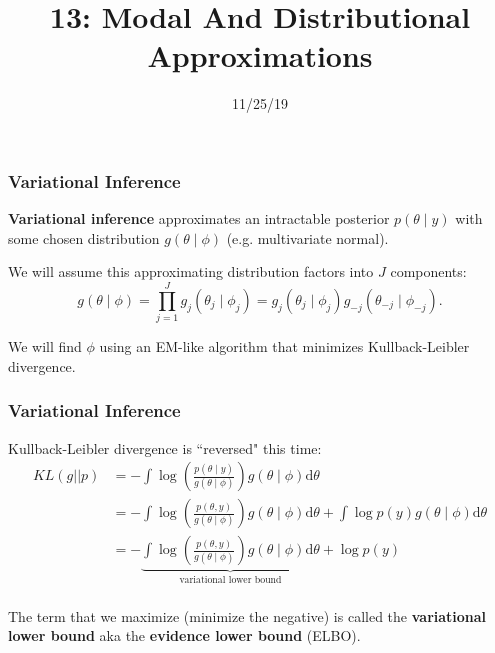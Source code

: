 \documentclass{beamer}
\title["13"]{13: Modal And Distributional Approximations}
\date{11/25/19}
\begin{document}

\begin{frame}
\titlepage 
\end{frame}


\begin{frame}[fragile]
\frametitle{Variational Inference}

{\bf Variational inference} approximates an intractable posterior $p(\theta \mid y)$ with some chosen distribution $g(\theta \mid \phi)$ (e.g. multivariate normal).
\newline
\pause

We will assume this approximating distribution factors into $J$ components:
$$
g(\theta \mid \phi) = \prod_{j=1}^J g_j(\theta_j \mid \phi_j) = g_j(\theta_j \mid \phi_j)g_{-j}(\theta_{-j} \mid \phi_{-j}).
$$


We will find $\phi$ using an EM-like algorithm that minimizes Kullback-Leibler divergence.

\end{frame}

\begin{frame}[fragile]
\frametitle{Variational Inference}

Kullback-Leibler divergence is ``reversed" this time:
\begin{align*}
KL(g || p) &= - \int \log \left( \frac{ p(\theta \mid y)}{g(\theta \mid \phi)} \right) g(\theta \mid \phi)\text{d}\theta  \\
&= - \int \log \left( \frac{ p(\theta, y)}{g(\theta \mid \phi)} \right) g(\theta \mid \phi)\text{d}\theta
+ \int \log p(y)g(\theta \mid \phi) \text{d}\theta \\
&= - \underbrace{\int \log \left( \frac{ p(\theta, y)}{g(\theta \mid \phi)} \right) g(\theta \mid \phi)\text{d}\theta}_{\text{variational lower bound}}
+  \log p(y) \\
\end{align*}

The term that we maximize (minimize the negative) is called the {\bf variational lower bound} aka the {\bf evidence lower bound} (ELBO).

\end{frame}
\end{document}
